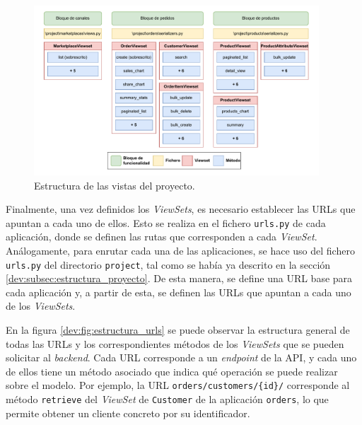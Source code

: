 \begin{figure}
    \centering
    \includegraphics[width=0.95\textwidth]{figures/design_develop/estructura_views.pdf}
    \caption{Estructura de las vistas del proyecto.}
    \label{dev:fig:estructura_views}
\end{figure}

Finalmente, una vez definidos los \textit{ViewSets}, es necesario establecer las URLs que apuntan a cada uno de ellos. Esto se realiza en el fichero \texttt{urls.py} de cada aplicación, donde se definen las rutas que corresponden a cada \textit{ViewSet}. Análogamente, para enrutar cada una de las aplicaciones, se hace uso del fichero \texttt{urls.py} del directorio \texttt{project}, tal como se había ya descrito en la sección \ref{dev:subsec:estructura_proyecto}. De esta manera, se define una URL base para cada aplicación y, a partir de esta, se definen las URLs que apuntan a cada uno de los \textit{ViewSets}.

En la figura \ref{dev:fig:estructura_urls} se puede observar la estructura general de todas las URLs y los correspondientes métodos de los \textit{ViewSets} que se pueden solicitar al \textit{backend}. Cada URL corresponde a un \textit{endpoint} de la API, y cada uno de ellos tiene un método asociado que indica qué operación se puede realizar sobre el modelo. Por ejemplo, la URL \texttt{orders/customers/\{id\}/} corresponde al método \texttt{retrieve} del \textit{ViewSet} de \texttt{Customer} de la aplicación \texttt{orders}, lo que permite obtener un cliente concreto por su identificador.

